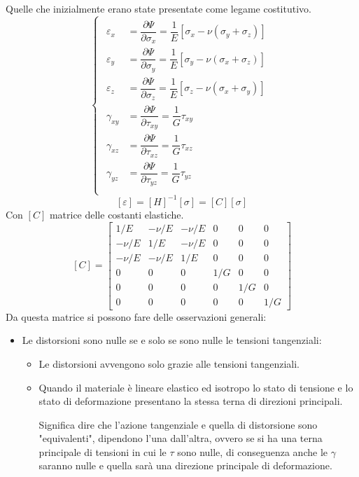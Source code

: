 \documentclass{article}
\begin{document}
\begin{adjustwidth}{2in}{}
Quelle che inizialmente erano state presentate come legame costitutivo. 
	\[
	\begin{cases}
		\begin{aligned}
			\varepsilon_x & = \dfrac{\partial\Psi}{\partial \sigma_x} = \dfrac{1}{E}[\sigma_x - \nu(\sigma_y + \sigma_z)] \\
			\varepsilon_y & = \dfrac{\partial\Psi}{\partial \sigma_y} = \dfrac{1}{E}[\sigma_y - \nu(\sigma_x + \sigma_z)] \\
			\varepsilon_z & = \dfrac{\partial\Psi}{\partial \sigma_z} = \dfrac{1}{E}[\sigma_z - \nu(\sigma_x + \sigma_y)] \\
			\gamma_{xy} & =  \dfrac{\partial\Psi}{\partial \tau_{xy}} = \dfrac{1}{G} \tau_{xy} \\
			\gamma_{xz} & =  \dfrac{\partial\Psi}{\partial \tau_{xz}} = \dfrac{1}{G} \tau_{xz} \\
			\gamma_{yz} & =  \dfrac{\partial\Psi}{\partial \tau_{yz}} = \dfrac{1}{G} \tau_{yz} \\
		\end{aligned}
	\end{cases}
	\]
	\[
	[\varepsilon] = [H]^{-1}[\sigma] = [C][\sigma]
	\]
	Con $ [C]$ matrice delle costanti elastiche.
	\[
	[C] = \left[ \begin{array}{cccccc}
		1/E & -\nu/E & -\nu/E & 0 & 0 & 0 \\
		-\nu/E & 1/E & -\nu/E & 0 & 0 & 0 \\
		-\nu/E & -\nu/E & 1/E & 0 & 0 & 0 \\
		0 & 0 & 0 & 1/G & 0 & 0 \\
		0 & 0 & 0 & 0 & 1/G & 0 \\
		0 & 0 & 0 & 0 & 0 & 1/G
	\end{array} \right] 
	\]
	Da questa matrice si possono fare delle osservazioni generali: 
	
	\begin{itemize}
		\item Le distorsioni sono nulle se e solo se sono nulle le tensioni tangenziali:
		\begin{itemize}
			\item Le distorsioni avvengono solo grazie alle tensioni tangenziali.
			\item Quando il materiale è lineare elastico ed isotropo lo stato di tensione e lo stato di
			deformazione presentano la stessa terna di direzioni principali. \newline 
			
			Significa dire che l'azione tangenziale e quella di distorsione sono "equivalenti", dipendono l'una dall'altra, ovvero se si ha una terna principale di tensioni in cui le $\tau$ sono nulle, di conseguenza anche le $\gamma$ saranno nulle e quella sarà una direzione principale di deformazione.
		\end{itemize}
	

\end{itemize}
\end{adjustwidth}
\end{document}
